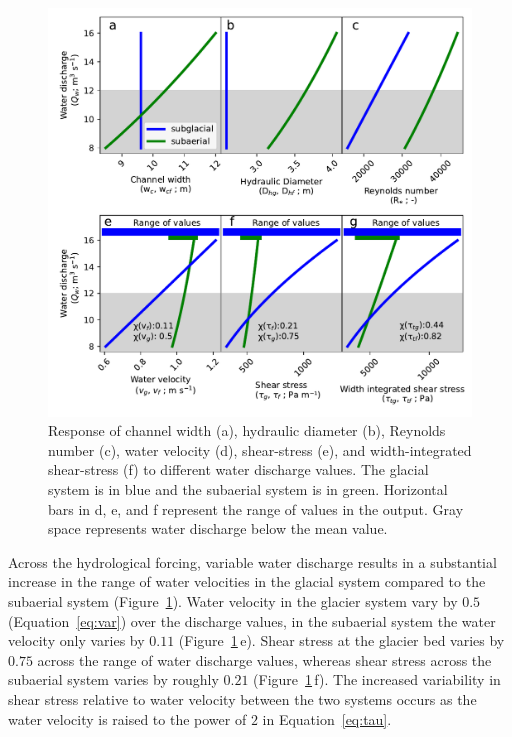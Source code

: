 \documentclass[draft]{agujournal2019}
\begin{document}
  \begin{center}
    \begin{figure}[H]
      \includegraphics[width=0.7\linewidth]{model_outputs.pdf}
      \caption{Response of channel width (a), hydraulic diameter (b),  Reynolds number  (c),  water velocity (d), shear-stress (e), and width-integrated shear-stress (f)  to different water discharge values. The glacial system is in blue and the subaerial system is in green.  Horizontal bars in d, e, and f represent the range of values in the  output. Gray space represents water discharge below the mean value. }
      \label{fig:model_outs}
    \end{figure}
  \end{center}
  
  Across the hydrological forcing, variable water discharge results in a substantial increase in the range of water velocities in the glacial system compared to the subaerial system (Figure~\ref{fig:model_outs}).
  Water velocity in the glacier system vary by  $0.5$ (Equation~\ref{eq:var}) over the discharge values, in the subaerial system the water velocity only varies by $0.11$ (Figure~\ref{fig:model_outs}\,e).
  Shear stress at the glacier bed varies by $0.75$ across the range of water discharge values, whereas shear stress across the subaerial system varies by roughly $0.21$ (Figure~\ref{fig:model_outs}\,f). The increased variability in shear stress relative to water velocity between the two systems occurs as the water velocity is raised to the power of $2$ in Equation~\ref{eq:tau}. 
  
\end{document}
